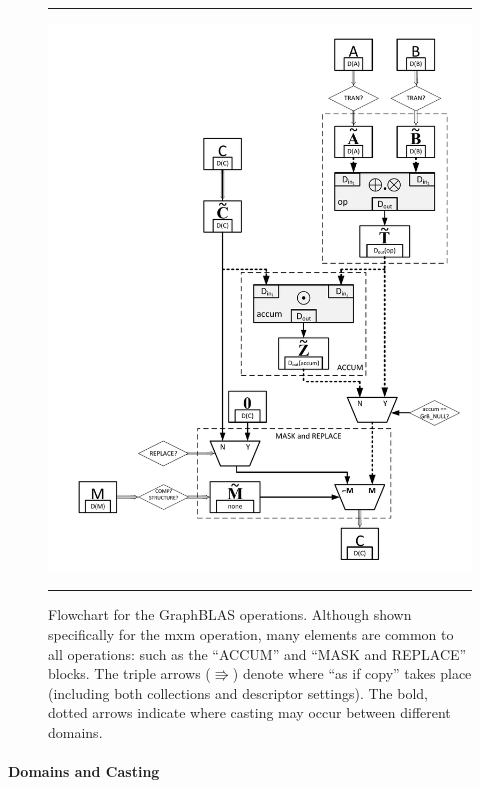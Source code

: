 \begin{figure}[p]
    \hrule
    \begin{center}
        \includegraphics[width=5.5in]{mxm_operation_flowchart_1_3d.pdf}
    \end{center}
    \caption[Flowchart for the GraphBLAS operations.]{Flowchart for the GraphBLAS operations. Although shown specifically for
	the {\sf mxm} operation, many elements are common to all operations: such as the 
	``{\sf ACCUM}'' and ``{\sf MASK and REPLACE}'' blocks.  The triple arrows 
    ($\Rrightarrow$) denote where ``as if copy'' takes place (including both 
    collections and descriptor settings).  The bold, dotted arrows indicate
    where casting may occur between different domains.}
    \label{Fig:mxmFlowchart}
    \hrule
\end{figure}

\paragraph{Domains and Casting}

